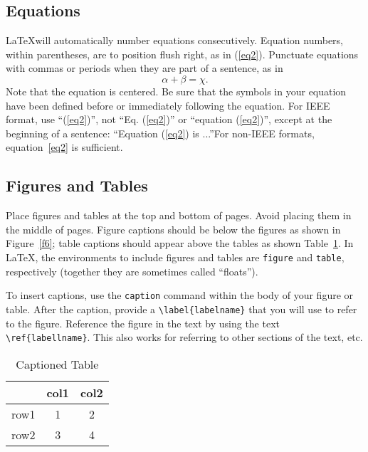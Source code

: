 \documentclass{wsecapstone}
\begin{document}
\subsection{Equations}
\LaTeX will automatically number equations consecutively. Equation numbers, within parentheses, are to position flush right, as in (\ref{eq2}). Punctuate equations with commas or periods when they are part of a sentence, as in
\begin{equation}
\alpha + \beta = \chi.
\label{eq2}
\end{equation}
Note that the equation is centered. Be sure that the symbols in your equation have been defined before or immediately following the equation. For IEEE format, use ``(\ref{eq2})'', not ``Eq. (\ref{eq2})'' or ``equation (\ref{eq2})'', except at the beginning of a sentence: ``Equation (\ref{eq2}) is ...''For non-IEEE formats, equation~\ref{eq2} is sufficient. 

\subsection{Figures and Tables}
Place figures and tables at the top and bottom of pages. Avoid placing them in the middle of pages. Figure captions should be below the figures as shown in Figure~\ref{f6}; table captions should appear above the tables as shown Table~\ref{t1}. In \LaTeX, the environments to include figures and tables are \lstinline{figure} and \lstinline{table}, respectively (together they are sometimes called ``floats''). 

To insert captions, use the \lstinline{caption} command within the body of your figure or table.  After the caption, provide a \lstinline|\label{labelname}| that you will use to refer to the figure.  Reference the figure in the text by using the text \lstinline|\ref{labellname}|.  This also works for referring to other sections of the text, etc. 

\begin{table}[hpt]
\caption{Captioned Table}
\label{t1}
\begin{center}
\begin{tabular}{lcc}
\toprule
 & col1 & col2 \\
\midrule
row1 & 1 & 2 \\
row2 & 3 & 4 \\
\bottomrule
\end{tabular}
\end{center}
\end{table}
\end{document}
